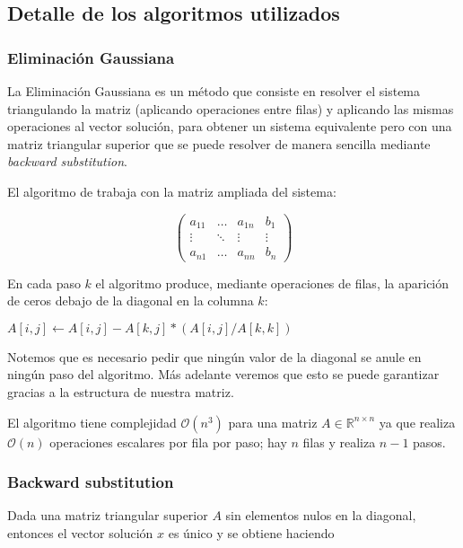 \subsection{Detalle de los algoritmos utilizados}
\subsubsection{Eliminación Gaussiana}
La Eliminación Gaussiana es un método que consiste en resolver el sistema triangulando la matriz (aplicando operaciones entre filas) y aplicando las mismas operaciones al vector solución, para obtener un sistema equivalente pero con una matriz triangular superior que se puede resolver de manera sencilla mediante \emph{backward substitution}.

El algoritmo de trabaja con la matriz ampliada del sistema:

\[\left(\begin{array}{ccc|c}
a_{11} & \ldots & a_{1n} & b_1\\
\vdots & \ddots & \vdots & \vdots\\
a_{n1} & \ldots & a_{nn} & b_n
\end{array}\right)\]

En cada paso $k$ el algoritmo produce, mediante operaciones de filas, la aparición de ceros debajo de la diagonal en la columna $k$:

\begin{algorithmic}
    \State $A[i, j] \gets A[i, j] - A[k, j]*(A[i, j]/A[k, k])$
   \EndFor
  \EndFor
 \EndFor
\end{algorithmic}

Notemos que es necesario pedir que ningún valor de la diagonal se anule en ningún paso del algoritmo. Más adelante veremos que esto se puede garantizar gracias a la estructura de nuestra matriz.

El algoritmo tiene complejidad $\mathcal{O}(n^3)$ para una matriz $A \in \mathbb{R}^{n \times n}$ ya que realiza $\mathcal{O}(n)$ operaciones escalares por fila por paso; hay $n$ filas y realiza $n-1$ pasos.

\subsubsection{Backward substitution}
Dada una matriz triangular superior $A$ sin elementos nulos en la diagonal, entonces el vector solución $x$ es único y se obtiene haciendo

